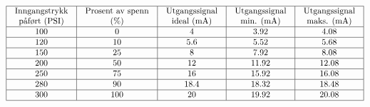 






$$\vbox{\offinterlineskip
\halign{\strut
\vrule \quad\hfil # \ \hfil & 
\vrule \quad\hfil # \ \hfil & 
\vrule \quad\hfil # \ \hfil & 
\vrule \quad\hfil # \ \hfil & 
\vrule \quad\hfil # \ \hfil \vrule \cr
\noalign{\hrule}
%
Inngangstrykk & Prosent av spenn & Utgangssignal & Utgangssignal & Utgangssignal \cr
%
påført (PSI) & (\%) & ideal (mA) & min. (mA) & maks. (mA) \cr
%
\noalign{\hrule}
%
100 & 0 & 4 & 3.92 & 4.08 \cr
%
\noalign{\hrule}
%
120 & 10 & 5.6 & 5.52 & 5.68 \cr
%
\noalign{\hrule}
%
150 & 25 & 8 & 7.92 & 8.08 \cr
%
\noalign{\hrule}
%
200 & 50 & 12 & 11.92 & 12.08 \cr
%
\noalign{\hrule}
%
250 & 75 & 16 & 15.92 & 16.08 \cr
%
\noalign{\hrule}
%
280 & 90 & 18.4 & 18.32 & 18.48 \cr
%
\noalign{\hrule}
%
300 & 100 & 20 & 19.92 & 20.08 \cr
%
\noalign{\hrule}
} %
}$$ %


